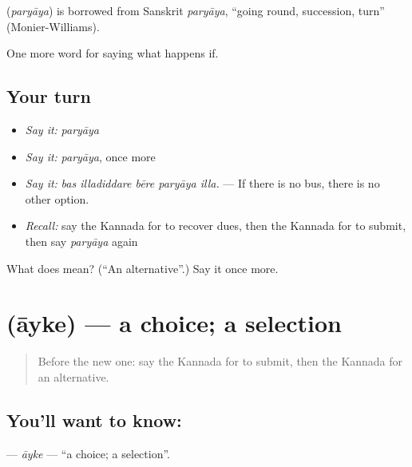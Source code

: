 \begin{cousinweb}
\textbf{} (\emph{paryāya}) is borrowed from Sanskrit \emph{paryāya}, \textquotedblleft{}going round, succession, turn\textquotedblright{} (Monier-Williams).
\end{cousinweb}

\begin{grammarlens}[title={What you've built}]
One more word for saying what happens if.
\end{grammarlens}

\subsection*{Your turn}
\begin{itemize}
\raggedright
  \item \emph{Say it:} \emph{paryāya}
  \item \emph{Say it:} \emph{paryāya}, once more
  \item \emph{Say it:} \emph{bas illadiddare bēre paryāya illa.} — If there is no bus, there is no other option.
  \item \emph{Recall:} say the Kannada for to recover dues, then the Kannada for to submit, then say \emph{paryāya} again
\end{itemize}

\begin{tcolorbox}[breakable,colback=teal!4,colframe=teal!35!black,title={Before you move on}]
What does  mean? (\textquotedblleft{}An alternative\textquotedblright{}.) Say it once more.
\end{tcolorbox}
\section[\texorpdfstring{\kn{ಆಯ್ಕೆ} (āyke)}{ಆಯ್ಕೆ (āyke)}]{ (āyke) — a choice; a selection}

\label{lesson:KA-C418-ayke}



\begin{quote}
Before the new one: say the Kannada for to submit, then the Kannada for an alternative.
\end{quote}

\subsection*{You'll want to know: }
\textbf{} — \emph{āyke} — \textquotedblleft{}a choice; a selection\textquotedblright{}.

